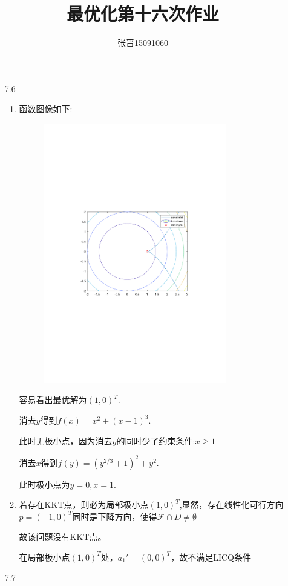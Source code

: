\documentclass[UTF8]{ctexart}
\title{\heiti 最优化第十六次作业}
\author{\kaishu 张晋15091060}
\begin{document}
\maketitle

\begin{enumerate}
\item[7.6]
\begin{enumerate}
\item
函数图像如下:
\begin{figure}[H]
\centering
\includegraphics[width=8cm]{1.pdf}
\end{figure}

容易看出最优解为$(1,0)^T$.

消去$y$得到$f(x)={x^2} + {\left( {x - 1} \right)^3}$.

此时无极小点，因为消去$y$的同时少了约束条件:$x\geq 1$

消去$x$得到$f(y)=(y^{2/3}+1)^2+y^2$.

此时极小点为$y=0,x=1$.

\item
若存在KKT点，则必为局部极小点$(1,0)^T$,显然，存在线性化可行方向$p=(-1,0)^T$同时是下降方向，使得$\mathcal{F}\cap D \ne \emptyset$

故该问题没有KKT点。

在局部极小点$(1,0)^T$处，$a_1'=(0,0)^T$，故不满足LICQ条件
\end{enumerate}
\item[7.7]


\end{enumerate}
\end{document}
